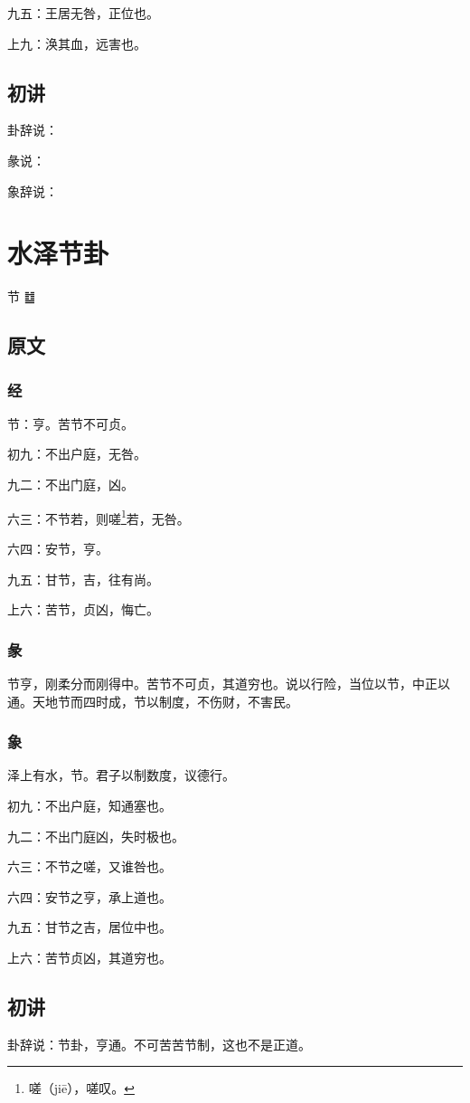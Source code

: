 \documentclass[12pt,oneside]{book}
\begin{document}
九五：王居无咎，正位也。

上九：涣其血，远害也。

\section{初讲}
卦辞说：

彖说：

象辞说：


\chapter{水泽节卦}
节 {\Large ䷻}


\section{原文}

\subsection{经}
节：亨。苦节不可贞。

初九：不出户庭，无咎。

九二：不出门庭，凶。

六三：不节若，则嗟\footnote{嗟（jiē），嗟叹。}若，无咎。

六四：安节，亨。

九五：甘节，吉，往有尚。

上六：苦节，贞凶，悔亡。


\subsection{彖}
节亨，刚柔分而刚得中。苦节不可贞，其道穷也。说以行险，当位以节，中正以通。天地节而四时成，节以制度，不伤财，不害民。

\subsection{象}
泽上有水，节。君子以制数度，议德行。

初九：不出户庭，知通塞也。

九二：不出门庭凶，失时极也。

六三：不节之嗟，又谁咎也。

六四：安节之亨，承上道也。

九五：甘节之吉，居位中也。

上六：苦节贞凶，其道穷也。


\section{初讲}
卦辞说：节卦，亨通。不可苦苦节制，这也不是正道。
\end{document}
